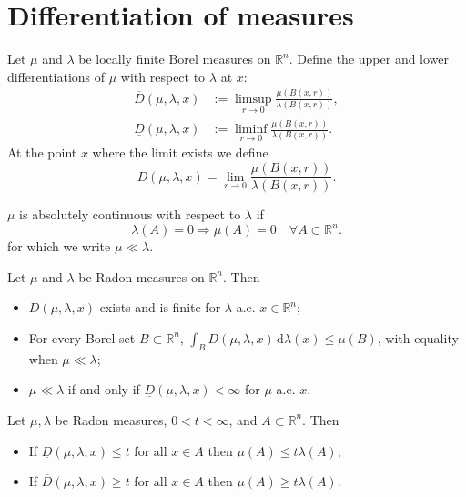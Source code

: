 \section{Differentiation of measures}
\begin{definition}
Let $\mu$ and $\lambda$ be locally finite Borel measures on $\mathbb{R}^{n}$. Define the upper and lower differentiations of $\mu$ with respect to $\lambda$ at $x$:
\begin{align*}
\overline{D}(\mu,\lambda,x)&:=\limsup_{r\to 0}\frac{\mu(B(x,r))}{\lambda(B(x,r))},\\
\underline{D}(\mu,\lambda,x)&:=\liminf_{r\to 0}\frac{\mu(B(x,r))}{\lambda(B(x,r))}.
\end{align*}
At the point $x$ where the limit exists we define 
$$
D(\mu,\lambda,x)=\lim_{r\to 0}\frac{\mu(B(x,r))}{\lambda(B(x,r))}.
$$
\end{definition}

\begin{definition}
    $\mu$ is absolutely continuous with respect to $\lambda$ if$$
    \lambda(A)=0\Rightarrow \mu(A)=0\quad\forall A \subset \mathbb{R}^{n}.
    $$for which we write $\mu\ll \lambda$.
\end{definition}

\begin{theorem}\label{thm:diff-meas}
Let $\mu$ and $\lambda$ be Radon measures on $\mathbb{R}^{n}$. Then
\begin{itemize}
\item[(i)] $D(\mu,\lambda,x)$ exists and is finite for $\lambda$-a.e. $x\in \mathbb{R}^{n}$;
\item[(ii)] For every Borel set $B \subset \mathbb{R}^{n}$, $\displaystyle\int_{B}D(\mu,\lambda,x)\,\mathrm{d}\lambda(x)\le \mu(B)$, with equality when $\mu\ll\lambda$;
\item[(iii)] $\mu\ll\lambda$ if and only if $\underline{D}(\mu,\lambda,x)<\infty$ for $\mu$-a.e. $x$.
\end{itemize}
\end{theorem}

\begin{lemma}\label{lem:deriv-ineq}
Let $\mu,\lambda$ be Radon measures, $0<t<\infty$, and $A\subset\mathbb{R}^{n}$. Then
\begin{itemize}
\item[(i)] If $\underline{D}(\mu,\lambda,x)\le t$ for all $x\in A$ then $\mu(A)\le t\lambda(A)$;
\item[(ii)] If $\overline{D}(\mu,\lambda,x)\ge t$ for all $x\in A$ then $\mu(A)\ge t\lambda(A)$.
\end{itemize}
\end{lemma}

